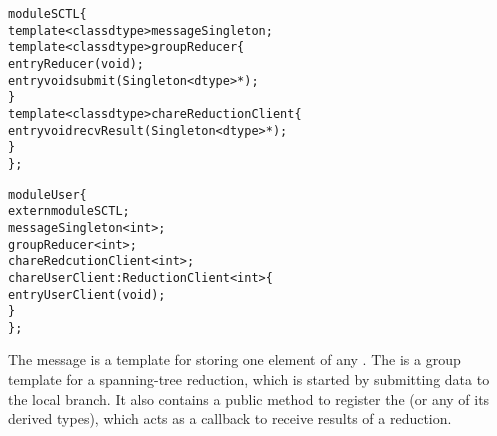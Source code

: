 \begin{alltt}
module SCTL \{
  template <class dtype> message  Singleton;
  template <class dtype> group Reducer \{
    entry Reducer(void);
    entry void submit(Singleton<dtype> *);
  \}
  template <class dtype> chare ReductionClient \{
    entry void recvResult(Singleton<dtype> *);
  \}
\};

module User \{
  extern module SCTL;
  message Singleton<int>;
  group Reducer<int>;
  chare RedcutionClient<int>;
  chare UserClient : ReductionClient<int> \{
    entry UserClient(void);
  \}
\};
\end{alltt}

The  message is a template for storing one element of any
. The  is a group template for a spanning-tree reduction,
which is started by submitting data to the local branch. It also contains a
public method to register the  (or any of its derived
types), which acts as a callback to receive results of a reduction.

